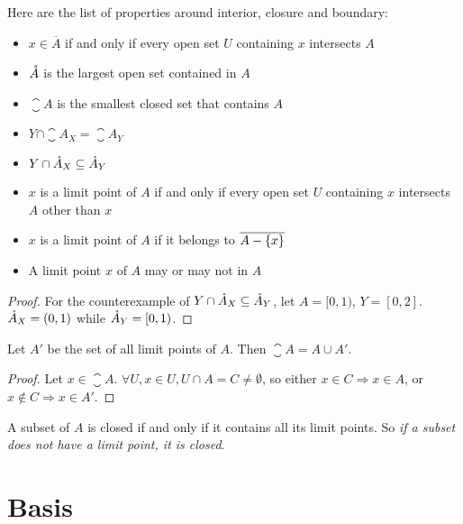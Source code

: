 \begin{theorem}
    Here are the list of properties around interior, closure and boundary:
    \begin{itemize}
        \item $x \in \overline{A}$ if and only if every open set $U$ containing $x$ intersects $A$
        \item $\mathring{A}$ is the largest open set contained in $A$
        \item $\closure{A}$ is the smallest closed set that contains $A$
        \item $Y \cap \closure{A}_X = \closure{A}_Y$
        \item $Y \cap \mathring{A}_X \subseteq \mathring{A}_Y$
        \item $x$ is a limit point of $A$ if and only if every open set $U$ containing $x$ intersects $A$ other than $x$
        \item $x$ is a limit point of $A$ if it belongs to $\overline{A - \set{x}}$
        \item A limit point $x$ of $A$ may or may not in $A$
    \end{itemize}
\end{theorem}
\begin{proof}
    For the counterexample of $Y \cap \mathring{A}_X \subseteq \mathring{A}_Y$, let $A = [0,1)$, $Y = [0,2]$. $\mathring{A}_X = (0,1)$ while $\mathring{A}_Y = [0,1)$.
\end{proof}





\begin{theorem}
    Let $A'$ be the set of all limit points of $A$. Then $\closure{A} = A \cup A'$.
\end{theorem}
\begin{proof}
    Let $x \in \closure{A}$. $\forall U, x \in U, U \cap A = C \neq \emptyset$, so either $x \in C \Rightarrow x \in A$, or $x \notin C \Rightarrow x \in A'$.
\end{proof}

\begin{theorem}
A subset of $A$ is closed if and only if it contains all its limit points. So \emph{if a subset does not have a limit point, it is closed}.
\end{theorem}


\section{Basis}



